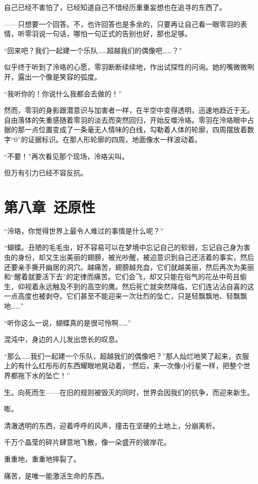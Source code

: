 \documentclass[UTF8, scheme = chinese, openany]{ctexbook}
\begin{document}
自己已经不害怕了，已经知道自己不惜经历重重妄想也在追寻的东西了。

——只想要一个回答。不，也许回答也是多余的，只要再让自己看一眼零羽的表情，听零羽说一句话，哪怕一句正式的告别也好，那也足够。

“回来吧？我们一起建一个乐队……超越我们的偶像吧……？”

似乎终于听到了泠珞的心愿，零羽断断续续地，作出试探性的问询。她的嘴微微咧开，露出一个像是笑容的弧度。

“我听你的！你说什么我都会去做的！”

然而，零羽的身影跟潜意识与加害者一样，在半空中变得透明，迅速地趋近于无。自由落体的失重感随着零羽的淡去而突然回归，开始反噬泠珞。零羽在泠珞眼中占据的那一点位置变成了一条毫无人情味的白线，勾勒着人体的轮廓，四周摆放着数字“0”的证据标识。在那人形轮廓的四周，地面像水一样波动着。

“不要！”再次看见那个现场，泠珞尖叫。

但万有引力已经不容反抗。

\chapter{第八章\ 还原性}

“泠珞，你觉得世界上最令人难过的事情是什么呢？”

“蝴蝶。丑陋的毛毛虫，好不容易可以在梦境中忘记自己的软弱，忘记自己身为害虫的身份，却又生出美丽的翅膀，被光吵醒，被迫意识到自己还活着的事实，然后还要亲手撕开幽居的洞穴。越痛苦，翅膀越充血，它们就越美丽，然后再次为美丽和“醒着就要活下去”的定律而痛苦。它们会飞，却又只能在俗气的花丛中苟且偷生，仰视着永远触及不到的高空的鹰。然后死亡就突然降临，它们连沾沾自喜的这一点高度也被剥夺。它们甚至不能迎来一次壮烈的坠亡，只是轻飘飘地、轻飘飘地……”

“听你这么一说，蝴蝶真的是很可怜啊……”

混沌中，身边的人儿发出悠长的叹息。

“那么……我们一起建一个乐队，超越我们的偶像吧？”那人灿烂地笑了起来，衣服上的有什么红彤彤的东西耀眼地晃动着，“然后，来一次像小行星一样，把整个世界都拖下水的坠亡！”

生。向死而生——在旧的规则被毁灭的同时，世界会因我们的抗争，而迎来新生。

嘭。

清澈透明的东西，迎着呼呼的风声，撞击在坚硬的土地上，分崩离析。

千万个晶莹的碎片肆意地飞散，像一朵盛开的彼岸花。

重重地，重重地摔裂了。

痛苦，是唯一能激活生命的东西。
\end{document}
